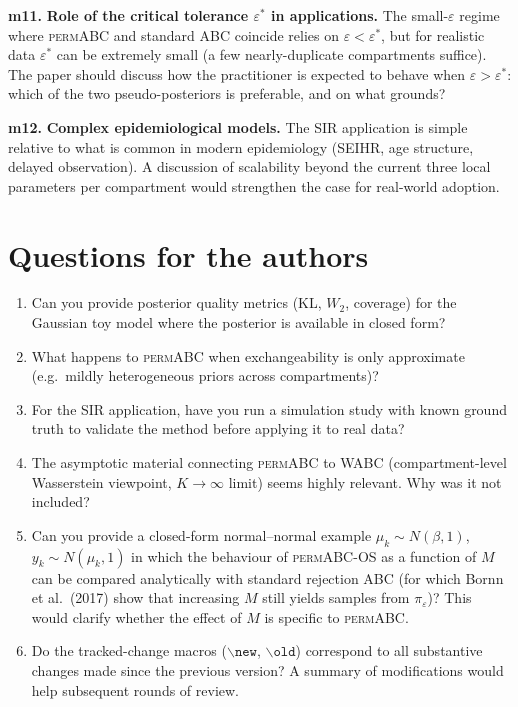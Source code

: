 \documentclass[11pt,a4paper]{article}
\newcommand{\minor}[1]{\textbf{\color{orange!80!black}m#1.}}
\begin{document}
\minor{11} \textbf{Role of the critical tolerance $\varepsilon^*$ in applications.} The small-$\varepsilon$ regime where \textsc{permABC} and standard ABC coincide relies on $\varepsilon < \varepsilon^*$, but for realistic data $\varepsilon^*$ can be extremely small (a few nearly-duplicate compartments suffice). The paper should discuss how the practitioner is expected to behave when $\varepsilon > \varepsilon^*$: which of the two pseudo-posteriors is preferable, and on what grounds?

\minor{12} \textbf{Complex epidemiological models.} The SIR application is simple relative to what is common in modern epidemiology (SEIHR, age structure, delayed observation). A discussion of scalability beyond the current three local parameters per compartment would strengthen the case for real-world adoption.

\section*{Questions for the authors}

\begin{enumerate}[nosep]
    \item Can you provide posterior quality metrics (KL, $W_2$, coverage) for the Gaussian toy model where the posterior is available in closed form?
    \item What happens to \textsc{permABC} when exchangeability is only approximate (e.g.\ mildly heterogeneous priors across compartments)?
    \item For the SIR application, have you run a simulation study with known ground truth to validate the method before applying it to real data?
    \item The asymptotic material connecting \textsc{permABC} to WABC (compartment-level Wasserstein viewpoint, $K \to \infty$ limit) seems highly relevant. Why was it not included?
    \item Can you provide a closed-form normal--normal example $\mu_k \sim N(\beta,1)$, $y_k \sim N(\mu_k,1)$ in which the behaviour of \textsc{permABC-OS} as a function of $M$ can be compared analytically with standard rejection ABC (for which Bornn et al.\ (2017) show that increasing $M$ still yields samples from $\pi_\varepsilon$)? This would clarify whether the effect of $M$ is specific to \textsc{permABC}.
    \item Do the tracked-change macros ($\backslash\texttt{new}$, $\backslash\texttt{old}$) correspond to all substantive changes made since the previous version? A summary of modifications would help subsequent rounds of review.
\end{enumerate}
\end{document}
